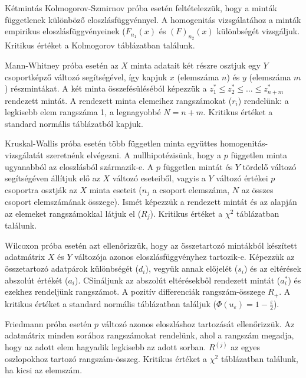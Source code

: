Kétmintás Kolmogorov-Szmirnov próba esetén feltételezzük, hogy a minták függetlenek különböző eloszlásfüggvénnyel. A homogenitás vizsgálatához a minták empirikus eloszlásfüggvényeinek ($F_{n_1}(x)$ és $(F)_{n_2}(x)$  különbségét vizsgáljuk. Kritikus értéket a Kolmogorov táblázatban találunk.

Mann-Whitney próba esetén az $X$ minta adatait két részre osztjuk egy $Y$ csoportképző változó segítségével, így kapjuk $x$ (elemszáma $n$) és $y$ (elemszáma $m$) részmintákat. A két minta összefésüléséból képezzük a $z_1^* \leq z_2^* \leq ... \leq z_{n+m}^*$ rendezett mintát. A rendezett minta elemeihez rangszámokat ($r_i$) rendelünk: a legkisebb elem rangszáma 1, a legnagyobbé $N=n+m$. Kritikus értéket a standard normális táblázatból kapjuk.

Kruskal-Wallis próba esetén több független minta együttes homogenitás-vizsgálatát szeretnénk elvégezni. A nullhipotézisünk, hogy a $p$ független minta ugyanabból az eloszlásból származik-e. A $p$ független mintát és $Y$ tördelő változó segítségéven állítjuk elő az $X$ változó eseteiből, vagyis a $Y$ változó értékei $p$ csoportra osztják az $X$ minta eseteit ($n_j$ a csoport elemszáma, $N$ az összes csoport elemszámának összege). Ismét képezzük a rendezett mintát és az alapján az elemeket rangszámokkal látjuk el ($R_j$). Kritikus értéket a $\chi^2$ táblázatban találunk.

Wilcoxon próba esetén azt ellenőrizzük, hogy az összetartozó mintákból készített adatmátrix $X$ és $Y$ változója azonos eloszlásfüggvényhez tartozik-e. Képezzük az összetartozó adatpárok különbségét ($d_i$), vegyük annak előjelét ($s_i$) és az eltérések abszolút értékét ($a_i$). CSináljunk az abszolút eltérésekből rendezett mintát ($a_i^*$) és ezekhez rendeljünk rangszámot. A pozitív differenciák rangszám-összege $R_+$. A kritikus értéket a standard normális táblázatban találjuk ($\Phi(u_\varepsilon) = 1-\frac{\varepsilon}{2}$).

Friedmann próba esetén $p$ változó azonos eloszláshoz tartozását ellenőrizzük. Az adatmátrix minden sorához rangszámokat rendelünk, ahol a rangszám megadja, hogy az adott elem hagyadik legkisebb az adott sorban. $R^{(j)}$ az egyes oszlopokhoz tartozó rangszám-összeg. Kritikus értéket a $\chi^2$ táblázatban találunk, ha kicsi az elemszám.